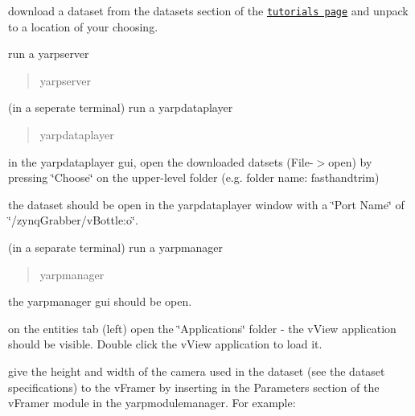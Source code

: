 \begin{DoxyItemize}
\item download a dataset from the datasets section of the \href{http://robotology.github.io/event-driven/doxygen/doc/html/pages.html}{\tt tutorials page} and unpack to a location of your choosing.
\item run a yarpserver
\end{DoxyItemize}

\begin{quote}
yarpserver \end{quote}



\begin{DoxyItemize}
\item (in a seperate terminal) run a yarpdataplayer
\end{DoxyItemize}

\begin{quote}
yarpdataplayer \end{quote}



\begin{DoxyItemize}
\item in the yarpdataplayer gui, open the downloaded datsets (File-\/$>$open) by pressing \char`\"{}\+Choose\char`\"{} on the upper-\/level folder (e.\+g. folder name\+: fasthandtrim)
\item the dataset should be open in the yarpdataplayer window with a \char`\"{}\+Port Name\char`\"{} of \char`\"{}/zynq\+Grabber/v\+Bottle\+:o\char`\"{}.
\item (in a separate terminal) run a yarpmanager
\end{DoxyItemize}

\begin{quote}
yarpmanager \end{quote}



\begin{DoxyItemize}
\item the yarpmanager gui should be open.
\item on the entities tab (left) open the \char`\"{}\+Applications\char`\"{} folder -\/ the v\+View application should be visible. Double click the v\+View application to load it.
\item give the height and width of the camera used in the dataset (see the dataset specifications) to the v\+Framer by inserting in the Parameters section of the v\+Framer module in the yarpmodulemanager. For example\+:
\end{DoxyItemize}

